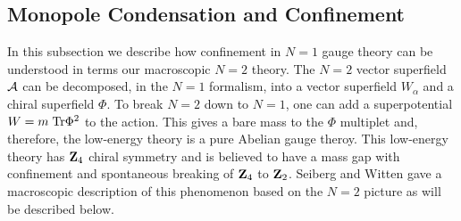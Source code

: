 \subsection{Monopole Condensation and Confinement}

In this subsection we describe how confinement in $N=1$ gauge theory
can be understood in terms our macroscopic $N=2$ theory. The $N = 2$
vector superfield ${\cal A}$ can be decomposed, in the $N=1$ formalism,
into a vector superfield $W_{\alpha}$ and a chiral superfield $\Phi$. To
break $N = 2$ down to $N = 1$, one can add a superpotential $W=m\;
{\rm Tr}\Phi^2$ to the action. This gives a bare mass to the $\Phi$
multiplet and, therefore, the low-energy theory is a pure Abelian
gauge theroy. This low-energy theory has ${\bf Z}_{4}$ chiral
symmetry and is believed to have a mass gap with confinement 
and spontaneous breaking of ${\bf Z}_4$ to ${\bf Z}_2$. Seiberg and
Witten gave a macroscopic description of this phenomenon based on the
$N=2$ picture as will be described below.

